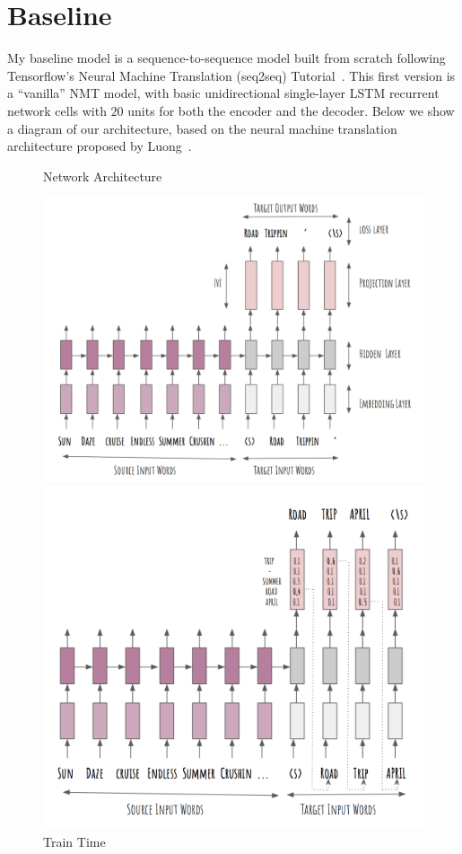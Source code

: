 \documentclass{article} %
\begin{document}
\section{Baseline}
\label{baseline}
My baseline model is a sequence-to-sequence model built from scratch following Tensorflow's Neural Machine Translation (seq2seq) Tutorial~\cite{luong17}.
This first version is a ``vanilla'' NMT model, with basic unidirectional single-layer LSTM recurrent network cells with $20$ units for both the encoder and the decoder. 
Below we show a diagram of our architecture, based on the neural machine translation architecture proposed by Luong~\cite{lmthang}.
\begin{figure}[ht]
	\caption{Network Architecture}
	\begin{minipage}[b]{0.55\linewidth}
		\centering
		\includegraphics[width=\textwidth]{train-arch.png}
		\caption{Train Time}
		\label{fig:figure1}
	\end{minipage}
	\hspace{0.5cm}
	\begin{minipage}[b]{0.45\linewidth}
		\centering
		\includegraphics[width=\textwidth]{infer-arch.png}

\end{minipage}
\end{figure}
\end{document}
